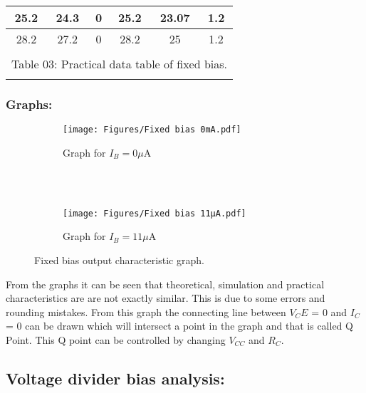 \documentclass[a4paper, 12pt]{extarticle}
\begin{document}
\begin{table}[htbp]
\begin{tabular}{cccccc}
    \midrule
    \multicolumn{1}{|c|}{25.2} & \multicolumn{1}{c|}{24.3} & \multicolumn{1}{c|}{0} & \multicolumn{1}{c|}{25.2} & \multicolumn{1}{c|}{23.07} & \multicolumn{1}{c|}{1.2} \\
    \midrule
    \multicolumn{1}{|c|}{28.2} & \multicolumn{1}{c|}{27.2} & \multicolumn{1}{c|}{0} & \multicolumn{1}{c|}{28.2} & \multicolumn{1}{c|}{25} & \multicolumn{1}{c|}{1.2} \\
    \midrule
          &       &       &       &       &  \\
    \multicolumn{6}{c}{Table 03: Practical data table of fixed bias.} \\
          &       &       &       &       &  \\
    \end{tabular}%
  \label{tab:addlabel}%
\end{table}%

\newpage
\restoregeometry
{}
\subsubsection{Graphs:}
\begin{figure} [h]
  \begin{subfigure}[b]{1\textwidth}
    \centering
    \texttt{[image: Figures/Fixed bias 0mA.pdf]}
    \caption{Graph for $I_B = 0\mu$A}
    \label{fig:subfig1}
  \end{subfigure}
  \\
  \\
  \begin{subfigure}[b]{1\textwidth}
    \centering
    \texttt{[image: Figures/Fixed bias 11µA.pdf]}
    \caption{Graph for $I_B = 11\mu$A}
    \label{fig:subfig2}
  \end{subfigure}
  \caption{Fixed bias output characteristic graph.}
  \label{fig:twosubfigures}
\end{figure}
From the graphs it can be seen that theoretical, simulation and practical characteristics are are not exactly similar. This is due to some errors and rounding mistakes. From this graph the connecting line between $V_CE$ = 0 and $I_C$ = 0 can be drawn which will intersect a point in the graph and that is called Q Point. This Q point can be controlled by changing $V_{CC}$ and $R_C$.

\newpage
\restoregeometry
{}
\subsection{Voltage divider bias analysis:}
\end{document}
